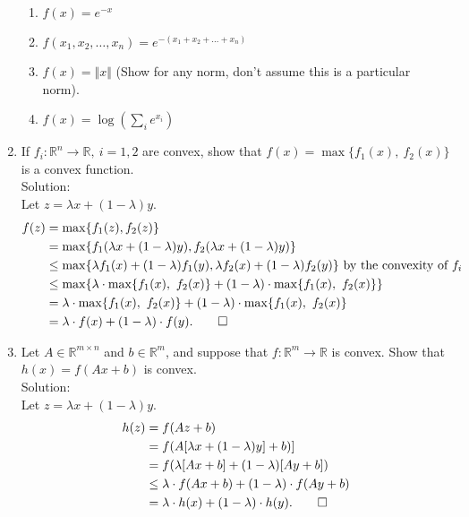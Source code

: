 \documentclass[12pt]{amsart}
\newcommand{\norm}[1]{\Vert #1 \Vert}
\newcommand{\Rn}{\R^n}
\newcommand{\Rm}{\R^m}
\newcommand{\R}{{\mathbb{R}}}
\newcommand{\map}[3]{#1:#2\rightarrow #3}
\begin{document}
\begin{enumerate}
\begin{enumerate}
\item
$f(x)=e^{-x}$
\item
$f(x_1,x_2,\dots,x_n)=e^{-(x_1+x_2+\dots +x_n)}$
\item
$f(x)=\norm{x}$ (Show for any norm, don't assume this is a particular norm). 
\item 
$f(x) = \log \left( \sum_i e^{x_i}\right)$
\end{enumerate}

\item
If $\map{f_i}{\Rn}{\R},\ i=1,2$ are convex, show that $f(x)=\max\{f_1(x),\ f_2(x)\}$
is a convex function. \\

\noindent
Solution: \\

Let $z = \lambda x + (1-\lambda) y$.
\begin{align*}
f(z) &= \max \{f_1(z), f_2(z)\} \\
        &= \max \{f_1(\lambda x + (1-\lambda) y), f_2(\lambda x + (1-\lambda) y)\}  \\
      &\leq \max \{\lambda f_1(x) + (1-\lambda) f_1(y), \lambda f_2(x) + (1-\lambda) f_2(y)\} \text{ by the convexity of } f_i\\
     &\leq \max \{\lambda \cdot \max\{f_1(x),\ f_2(x)\} + (1-\lambda) \cdot \max\{f_1(x),\ f_2(x)\}    \}\\
   & = \lambda \cdot \max\{f_1(x),\ f_2(x)\} + (1-\lambda) \cdot \max\{f_1(x),\ f_2(x)\}\\
   & = \lambda \cdot f(x) + (1-\lambda) \cdot f(y). \qed
\end{align*} 


\item
Let $A\in\R^{m\times n}$ and $b\in\Rm$, and suppose that
$\map{f}{\Rm}{\R}$ is convex. Show that $h(x)=f(Ax+b)$ is convex. \\

\noindent
Solution: \\

Let $z = \lambda x + (1-\lambda) y$.
\begin{align*}
h(z) &= f(Az + b)\\
&= f(A[\lambda x + (1-\lambda) y] + b)]\\
&= f(\lambda[Ax+b] + (1-\lambda)[Ay+b])\\
&\leq \lambda \cdot f(Ax+b) + (1-\lambda) \cdot f(Ay+b)\\
&= \lambda \cdot h(x) + (1-\lambda) \cdot h(y).  \qed
\end{align*}


\end{enumerate}
\end{document}

